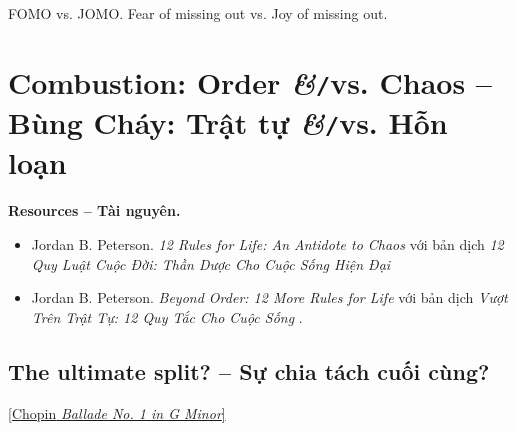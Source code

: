 \documentclass[12pt]{article}
\begin{document}
FOMO vs. JOMO. Fear of missing out vs. Joy of missing out.


\section{Combustion: Order {\it\&}{\tt/}vs. Chaos -- Bùng Cháy: Trật tự {\it\&}{\tt/}vs. Hỗn loạn}
\noindent\textbf{\textsf{Resources -- Tài nguyên.}}
\begin{itemize}
	\item {\sc Jordan B. Peterson}. {\it 12 Rules for Life: An Antidote to Chaos} \cite{Peterson2018} với bản dịch {\it 12 Quy Luật Cuộc Đời: Thần Dược Cho Cuộc Sống Hiện Đại} \cite{Peterson2022a}
	\item {\sc Jordan B. Peterson}. {\it Beyond Order: 12 More Rules for Life} \cite{Peterson2021} với bản dịch {\it Vượt Trên Trật Tự: 12 Quy Tắc Cho Cuộc Sống} \cite{Peterson2022b}.
\end{itemize}

\subsection{The ultimate split? -- Sự chia tách cuối cùng?}
\begin{flushright}
	\href{https://www.youtube.com/watch?v=dIbeazAlxM4}{\small[{\sc Chopin} {\it Ballade No. 1 in G Minor}]}
\end{flushright}
\end{document}
